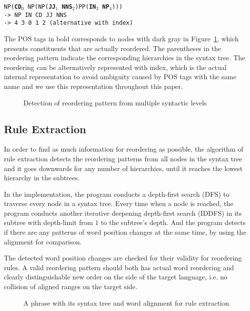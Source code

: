 \documentclass[a4paper]{article}
\begin{document}
\noindent \texttt{NP(\textbf{CD}$_0$ NP(NP(\textbf{JJ}$_1$ \textbf{NNS}$_2$)PP(\textbf{IN}$_3$ \textbf{NP}$_4$)))}\medskip\\
\texttt{-> NP IN CD JJ NNS}\\
\texttt{-> 4 3 0 1 2 (alternative with index)}\bigskip

The POS tags in bold corresponds to nodes with dark gray in Figure~\ref{unstructured}, which presents constituents that are actually reordered. The parentheses in the reordering pattern indicate the corresponding hierarchies in the syntax tree. The reordering can be alternatively represented with index, which is the actual internal representation to avoid ambiguity caused by POS tags with the same name and we use this representation throughout this paper.

\begin{figure}[ht]
\centering

\caption{Detection of reordering pattern from multiple syntactic levels}
\label{unstructured}
\end{figure}

\subsection{Rule Extraction}

In order to find as much information for reordering as possible, the algorithm of rule extraction detects the reordering patterns from all nodes in the syntax tree and it goes downwards for any number of hierarchies, until it reaches the lowest hierarchy in the subtrees.

In the implementation, the program conducts a depth-first search (DFS) to traverse every node in a syntax tree. Every time when a node is reached, the program conducts another iterative deepening depth-first search (IDDFS) in its subtree with depth-limit from $1$ to the subtree's depth. And the program detects if there are any patterns of word position changes at the same time, by using the alignment for comparison.

The detected word position changes are checked for their validity for reordering rules. A valid reordering pattern should both has actual word reordering and clearly distinguishable new order on the side of the target language, i.e. no collision of aligned ranges on the target side.

\begin{figure}[ht]
\centering

\caption{A phrase with its syntax tree and word alignment for rule extraction}
\label{extract}
\end{figure}
\end{document}
